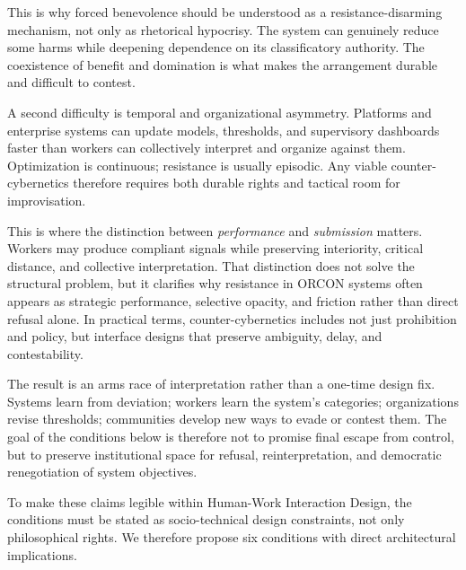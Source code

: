 \documentclass[runningheads]{llncs}
\begin{document}
This is why forced benevolence should be understood as a resistance-disarming mechanism, not only as rhetorical hypocrisy. The system can genuinely reduce some harms while deepening dependence on its classificatory authority. The coexistence of benefit and domination is what makes the arrangement durable and difficult to contest.

A second difficulty is temporal and organizational asymmetry. Platforms and enterprise systems can update models, thresholds, and supervisory dashboards faster than workers can collectively interpret and organize against them. Optimization is continuous; resistance is usually episodic. Any viable counter-cybernetics therefore requires both durable rights and tactical room for improvisation.

This is where the distinction between \emph{performance} and \emph{submission} matters. Workers may produce compliant signals while preserving interiority, critical distance, and collective interpretation. That distinction does not solve the structural problem, but it clarifies why resistance in ORCON systems often appears as strategic performance, selective opacity, and friction rather than direct refusal alone. In practical terms, counter-cybernetics includes not just prohibition and policy, but interface designs that preserve ambiguity, delay, and contestability.

The result is an arms race of interpretation rather than a one-time design fix. Systems learn from deviation; workers learn the system's categories; organizations revise thresholds; communities develop new ways to evade or contest them. The goal of the conditions below is therefore not to promise final escape from control, but to preserve institutional space for refusal, reinterpretation, and democratic renegotiation of system objectives.

To make these claims legible within Human-Work Interaction Design, the conditions must be stated as socio-technical design constraints, not only philosophical rights. We therefore propose six conditions with direct architectural implications.
\end{document}
